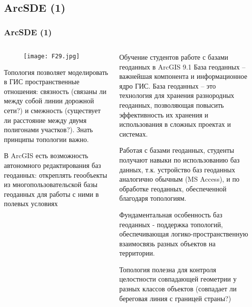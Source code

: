\documentclass[pdflatex,compress,8pt,
	xcolor={dvipsnames,dvipsnames,svgnames,x11names,table},
	hyperref={	 
	pdfauthor={Lemenkova Polina}, 
	pdfsubject={Preentation}, 
	pdfcreator={Lemenkova Polina}, 
	pdfproducer={Lemenkova Polina}, 
	colorlinks=true,
	linkcolor=Red3, 
	citecolor=NavyBlue, 
	urlcolor = NavyBlue, 
	breaklinks = true}]{beamer}
\begin{document}
\subsection{ArcSDE (1)}
\begin{frame}\frametitle{ArcSDE (1)}
	\begin{minipage}[0.4\textheight]{\textwidth}
		\begin{columns}[T]
			\begin{column}{0.5\textwidth}
				\begin{figure}[H]
					\centering
					\texttt{[image: F29.jpg]}
				\end{figure}
\small{				
				\begin{block}{}
Топология позволяет моделировать в ГИС пространственные отношения: связность (связаны ли между собой линии дорожной сети?) и смежность (существует ли расстояние между двумя полигонами участков?). Знать принципы топологии важно.
				\end{block}

				\begin{block}{}
В ArcGIS есть возможность автономного редактирования баз геоданных: откреплять геообъекты из многопользовательской базы геоданных для работы с ними в полевых условиях
				\end{block}
}
			\end{column}
			\begin{column}{0.5\textwidth}
		\small{
			\begin{alertblock}{}
Обучение студентов работе с базами геоданных в ArcGIS 9.1 База геоданных – важнейшая компонента и информационное ядро ГИС. База геоданных – это технология для хранения разнородных геоданных, позволяющая повысить эффективность их хранения и использования в сложных проектах и системах.
			\end{alertblock}

			\begin{block}{}
Работая с базами геоданных, студенты получают навыки по использованию баз данных, т.к. устройство баз геоданных аналогично обычным (MS Access), и по обработке геоданных, обеспеченной благодаря топологиям.
			\end{block}

			\begin{alertblock}{}
Фундаментальная особенность баз геоданных - поддержка топологий, обеспечивающая логико-пространственную взаимосвязь разных объектов на территории.
			\end{alertblock}

			\begin{alertblock}{}
Топология полезна для контроля целостности совпадающей геометрии у разных классов объектов 
(совпадает ли береговая линия с границей страны?)
			\end{alertblock}
		}
			\end{column}
		\end{columns}
	\end{minipage}
	
\end{frame}
\end{document}
